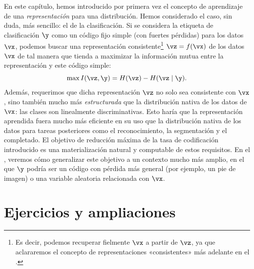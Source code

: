 \documentclass[../../book-main.tex]{subfiles}
\begin{document}
En este capítulo, hemos introducido por primera vez el concepto de
aprendizaje de una {\em representación} para una distribución. Hemos
considerado el caso, sin duda, más sencillo: el de la clasificación. Si
se considera la etiqueta de clasificación $\y$ como un código fijo simple (con
fuertes pérdidas) para los datos $\vx$, podemos buscar una representación 
consistente\footnote{Es decir, podemos recuperar fielmente $\vx$ a partir de 
    $\vz$, ya que aclararemos el concepto de representaciones «consistentes» más adelante en el
.} $\vz = f(\vx)$ de los datos $\vx$
de tal manera que tienda a maximizar la información mutua entre la
representación y este código simple:
\begin{equation}
    \max I(\vz, \y) = H(\vz) - H(\vz \mid \y).
\end{equation}
Además, requerimos que dicha representación $\vz$ no solo sea
consistente con $\vx$, sino también mucho más {\em estructurada} que la
distribución nativa de los datos de $\vx$: las clases son linealmente
discriminativas. Esto haría que la representación aprendida fuera mucho más
eficiente en su uso que la distribución nativa de los datos para tareas posteriores
como el reconocimiento, la segmentación y el completado. El objetivo de reducción máxima de la tasa de codificación 
introducido es una materialización natural y computable de estos requisitos. En el
, veremos cómo generalizar este
objetivo a un contexto mucho más amplio, en el que $\y$ podría ser un código con pérdida más general
(por ejemplo, un pie de imagen) o una variable aleatoria relacionada con $\vx$.

\section{Ejercicios y ampliaciones}
\end{document}
